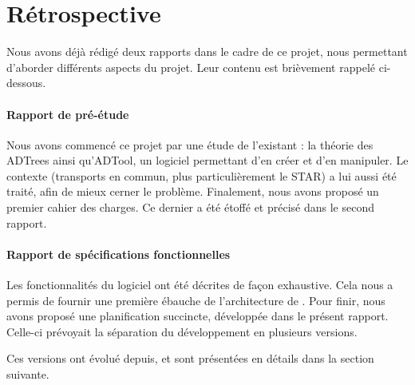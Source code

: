 \section{Rétrospective}
	\label{sec:retrospective}

	Nous avons déjà rédigé deux rapports dans le cadre de ce projet, nous permettant d'aborder différents aspects du projet. Leur contenu est brièvement rappelé ci-dessous.

	\paragraph{Rapport de pré-étude} Nous avons commencé ce projet par une étude de l'existant : la théorie des ADTrees ainsi qu'ADTool, un logiciel permettant d'en créer et d'en manipuler. Le contexte (transports en commun, plus particulièrement le STAR) a lui aussi été traité, afin de mieux cerner le problème. Finalement, nous avons proposé un premier cahier des charges. Ce dernier a été étoffé et précisé dans le second rapport.

	\paragraph{Rapport de spécifications fonctionnelles} Les fonctionnalités du logiciel ont été décrites de façon exhaustive. Cela nous a permis de fournir une première ébauche de l'architecture de \glasir{}. Pour finir, nous avons proposé une planification succincte, développée dans le présent rapport. Celle-ci prévoyait la séparation du développement en plusieurs versions.

	Ces versions ont évolué depuis, et sont présentées en détails dans la section suivante.